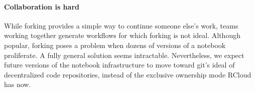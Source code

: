 \paragraph*{Collaboration is hard}
While forking provides a simple way to continue someone else's work,
teams working together generate workflows for which forking is not
ideal. Although popular, forking poses a problem when dozens of
versions of a notebook proliferate. A fully general solution seems
intractable. Nevertheless, we expect future versions of the
notebook infrastructure to move toward git's ideal of decentralized
code repositories, instead of the exclusive ownership mode RCloud has now.
